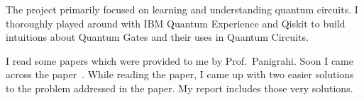 \documentclass[main.tex]{subfiles}
\begin{document}
	
    The project primarily focused on learning and understanding quantum circuits. I thoroughly played around with IBM Quantum Experience and Qiskit to build intuitions about Quantum Gates and their uses in Quantum Circuits.

    I read some papers which were provided to me by Prof.\ Panigrahi. Soon I came across the paper~\cite{mahanti2019quantum}. While reading the paper, I came up with two easier solutions to the problem addressed in the paper. My report includes those very solutions.
\end{document}
